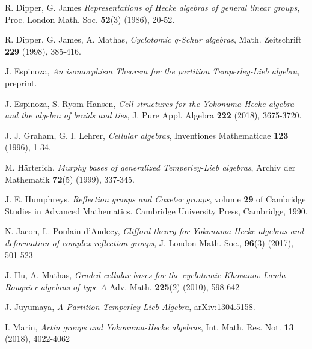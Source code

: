 \documentclass[10pt,a4,twoside,hidelinks,rm]{article}
\theoremstyle{plain}
\begin{document}
\begin{thebibliography}{99}



 R. Dipper, G. James
\textit{Representations of Hecke algebras of
  general linear groups}, Proc. London Math. Soc. {\bf 52}(3) (1986), 20-52.


 R. Dipper, G. James, A. Mathas,
\textit{Cyclotomic q-Schur algebras},  Math. Zeitschrift {\bf 229} (1998), 385-416.

 J. Espinoza, \textit{An isomorphism Theorem for the partition Temperley-Lieb
algebra}, preprint.



 J. Espinoza,
  S. Ryom-Hansen, \textit{Cell structures for the Yokonuma-Hecke algebra and the
  algebra of braids and ties}, J. Pure Appl. Algebra {\bf 222} (2018), 3675-3720.

  
 J. J. Graham, G. I. Lehrer,
\textit{Cellular algebras}, Inventiones Mathematicae {\bf 123} (1996), 1-34.

 M. H\"{a}rterich, \textit{Murphy bases of generalized Temperley-Lieb algebras}, Archiv der Mathematik {\bf 72}(5) (1999), 337-345.



 J. E. Humphreys, {\it Reflection groups and Coxeter groups}, volume {\bf 29} of Cambridge Studies in
Advanced Mathematics. Cambridge University Press, Cambridge, 1990.

  
 N. Jacon, L. Poulain d'Andecy,
  \textit{Clifford theory for Yokonuma-Hecke algebras and deformation of complex reflection groups},
  J. London Math. Soc., {\bf 96}(3) (2017), 501-523

{\color{black}
J. Hu, A. Mathas, 
\textit{Graded cellular bases for the cyclotomic Khovanov-Lauda-Rouquier algebras of type $A$}
Adv. Math. {\bf 225}(2) (2010), 598-642}

  
 J. Juyumaya,
  \textit{A Partition Temperley-Lieb Algebra}, arXiv:1304.5158.





 I. Marin, \textit{Artin groups and Yokonuma-Hecke algebras},
Int. Math. Res. Not. {\bf 13} (2018), 4022-4062 


\end{thebibliography}
\end{document}

